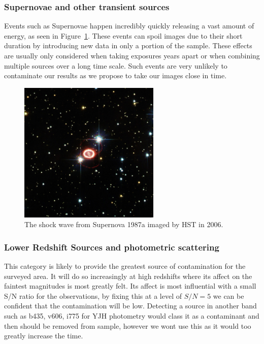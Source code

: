 		    \subsubsection*{Supernovae and other transient sources} %
		    \label{sub:supernovae_and_other_transient_sources}
		        Events such as Supernovae happen incredibly quickly releasing a vast amount of energy, as seen in Figure~\ref{fig:SNe_1987a}. These events can spoil images due to their short duration by introducing new data in only a portion of the sample. These effects are usually only considered when taking exposures years apart or when combining multiple sources over a long time scale. Such events are very unlikely to contaminate our results as we propose to take our images close in time.
		        \begin{figure}[htbp]
		            \centering
		            \includegraphics[width=0.6\textwidth]{../Images/SNe_1987a.jpg}
		            \caption{The shock wave from Supernova 1987a imaged by HST in 2006.\label{fig:SNe_1987a}}
		        \end{figure}

		    \subsubsection*{Lower Redshift Sources and photometric scattering} %
		    \label{sub:lower_redshift_sources_and_photometric_scattering}
		        This category is likely to provide the greatest source of contamination for the surveyed area. It will do so increasingly at high redshifts where its affect on the faintest magnitudes is most greatly felt. Its affect is most influential with a small S/N ratio for the observations, by fixing this at a level of $S/N = 5$ we can be confident that the contamination will be low. Detecting a source in another band such as b435, v606, i775 for YJH photometry would class it as a contaminant and then should be removed from sample, however we wont use this as it would too greatly increase the time.


